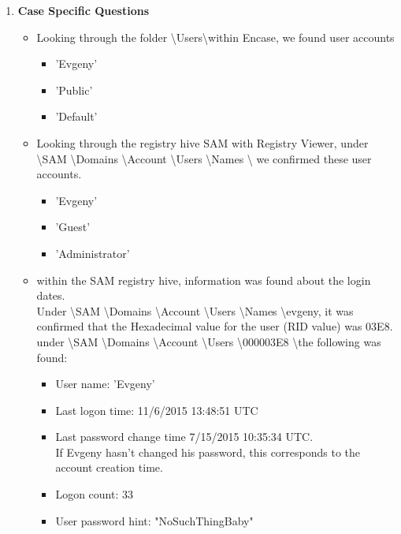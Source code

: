 \begin{enumerate}
\begin{itemize}
		
		
		
	\end{itemize}

\item \textbf{Case Specific Questions}

	\begin{itemize}
		
		\item Looking through the folder \textbackslash Users\textbackslash  within Encase, we found user accounts 
		
		\begin{itemize}
			\item 'Evgeny'
			\item 'Public'
			\item 'Default'
		\end{itemize} 
		
		\item Looking through the registry hive SAM with Registry Viewer, under
		\textbackslash SAM \textbackslash Domains \textbackslash Account \textbackslash Users \textbackslash Names \textbackslash
		 we confirmed these user accounts.
		
		\begin{itemize}
			\item 'Evgeny'
			\item 'Guest'
			\item 'Administrator'
		\end{itemize}
		
		\item within the SAM registry hive, information was found about the login dates.\\ 
		Under \textbackslash SAM \textbackslash Domains \textbackslash Account \textbackslash Users \textbackslash Names \textbackslash evgeny, it was confirmed that the Hexadecimal value for the user (RID value) was 03E8. under
		\textbackslash SAM \textbackslash Domains \textbackslash Account \textbackslash Users \textbackslash 000003E8 \textbackslash the following was found:
		
		\begin{itemize}
		\item User name: 'Evgeny'
		\item Last logon time: 11/6/2015 13:48:51 UTC
		\item Last password change time 7/15/2015 10:35:34 UTC.\\
		If Evgeny hasn't changed his password, this corresponds to the account creation time.
		\item Logon count: 33
		\item User password hint: "NoSuchThingBaby"
		\end{itemize}
		

\end{itemize}
\end{enumerate}
